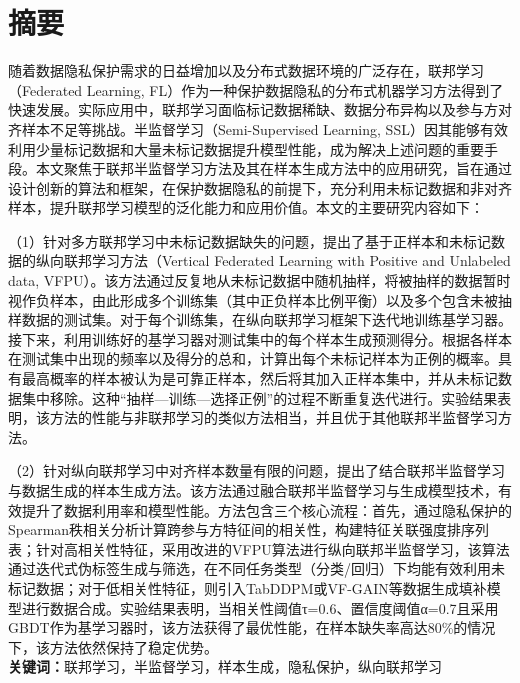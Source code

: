 


\chapter{摘\quad 要}
\xiaosi

随着数据隐私保护需求的日益增加以及分布式数据环境的广泛存在，联邦学习（Federated Learning, FL）作为一种保护数据隐私的分布式机器学习方法得到了快速发展。实际应用中，联邦学习面临标记数据稀缺、数据分布异构以及参与方对齐样本不足等挑战。半监督学习（Semi-Supervised Learning, SSL）因其能够有效利用少量标记数据和大量未标记数据提升模型性能，成为解决上述问题的重要手段。本文聚焦于联邦半监督学习方法及其在样本生成方法中的应用研究，旨在通过设计创新的算法和框架，在保护数据隐私的前提下，充分利用未标记数据和非对齐样本，提升联邦学习模型的泛化能力和应用价值。本文的主要研究内容如下：  

（1）针对多方联邦学习中未标记数据缺失的问题，提出了基于正样本和未标记数据的纵向联邦学习方法（Vertical Federated Learning with Positive and Unlabeled data, VFPU）。该方法通过反复地从未标记数据中随机抽样，将被抽样的数据暂时视作负样本，由此形成多个训练集（其中正负样本比例平衡）以及多个包含未被抽样数据的测试集。对于每个训练集，在纵向联邦学习框架下迭代地训练基学习器。接下来，利用训练好的基学习器对测试集中的每个样本生成预测得分。根据各样本在测试集中出现的频率以及得分的总和，计算出每个未标记样本为正例的概率。具有最高概率的样本被认为是可靠正样本，然后将其加入正样本集中，并从未标记数据集中移除。这种“抽样—训练—选择正例”的过程不断重复迭代进行。实验结果表明，该方法的性能与非联邦学习的类似方法相当，并且优于其他联邦半监督学习方法。

（2）针对纵向联邦学习中对齐样本数量有限的问题，提出了结合联邦半监督学习与数据生成的样本生成方法。该方法通过融合联邦半监督学习与生成模型技术，有效提升了数据利用率和模型性能。方法包含三个核心流程：首先，通过隐私保护的Spearman秩相关分析计算跨参与方特征间的相关性，构建特征关联强度排序列表；针对高相关性特征，采用改进的VFPU算法进行纵向联邦半监督学习，该算法通过迭代式伪标签生成与筛选，在不同任务类型（分类/回归）下均能有效利用未标记数据；对于低相关性特征，则引入TabDDPM或VF-GAIN等数据生成填补模型进行数据合成。实验结果表明，当相关性阈值τ=0.6、置信度阈值α=0.7且采用GBDT作为基学习器时，该方法获得了最优性能，在样本缺失率高达80\%的情况下，该方法依然保持了稳定优势。
\\ 

\noindent\songti\textbf{关键词：}联邦学习，半监督学习，样本生成，隐私保护，纵向联邦学习

\clearpage